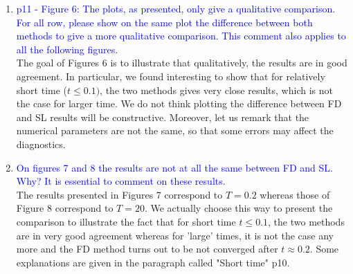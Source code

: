 \documentclass{article}
\begin{document}
\begin{enumerate}
\begin{enumerate}
\end{enumerate}
    \item \textcolor{blue}{p11 - Figure 6: The plots, as presented, only give a qualitative comparison. For all row, please show on the same plot the difference between both methods to give a more
qualitative comparison. This comment also applies to all the following figures.}\\
The goal of Figures 6 is to illustrate that qualitatively, the results are  in good agreement. In particular, we found interesting to show that 
for relatively short time ($t\leq 0.1)$, the two methods gives very close results, which is not the case for larger time. 
We do not think plotting the difference between FD and SL results will be constructive. Moreover, let us remark that 
the numerical parameters are not the same, so that some errors may affect the diagnostics. \\ %
    \item \textcolor{blue}{On figures 7 and 8 the results are not at all the same between FD and SL. Why? It is
essential to comment on these results.} \\
The results presented in Figures 7 correspond to $T=0.2$ whereas those of Figure 8 correspond to $T=20$. 
We actually choose this way to present the comparison to illustrate the fact that for short time $t\leq 0.1$, 
the two methods are in very good agreement whereas for 'large' times, it is not the case any more and the FD method 
turns out to be not converged after $t\approx 0.2$. Some explanations are given in the paragraph called "Short time" p10. \\

\end{enumerate}
\end{document}
